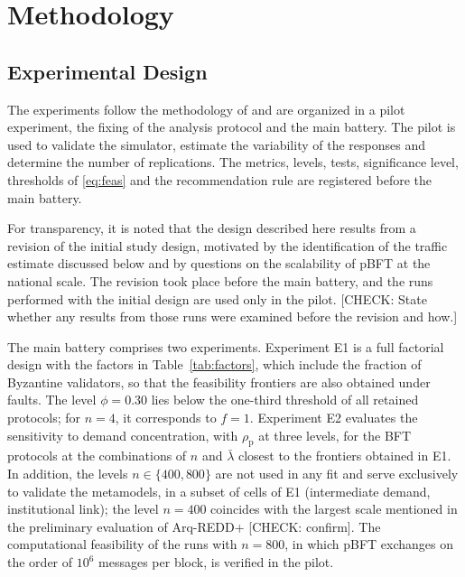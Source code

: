 \documentclass[english]{sbc2025}%
\newcommand{\chk}[1]{\textcolor{orange!80!black}{[CHECK: #1]}}
\begin{document}
\section{Methodology}
\label{sec:method}

\subsection{Experimental Design}

The experiments follow the methodology of \citet{Jain1991} and are organized in a pilot experiment, the fixing of the analysis protocol and the main battery. The pilot is used to validate the simulator, estimate the variability of the responses and determine the number of replications. The metrics, levels, tests, significance level, thresholds of \eqref{eq:feas} and the recommendation rule are registered before the main battery.

For transparency, it is noted that the design described here results from a revision of the initial study design, motivated by the identification of the traffic estimate discussed below and by questions on the scalability of pBFT at the national scale. The revision took place before the main battery, and the runs performed with the initial design are used only in the pilot. \chk{State whether any results from those runs were examined before the revision and how.}

The main battery comprises two experiments. Experiment E1 is a full factorial design with the factors in Table~\ref{tab:factors}, which include the fraction of Byzantine validators, so that the feasibility frontiers are also obtained under faults. The level $\phi = 0.30$ lies below the one-third threshold of all retained protocols; for $n = 4$, it corresponds to $f = 1$. Experiment E2 evaluates the sensitivity to demand concentration, with $\rho_{\mathrm{p}}$ at three levels, for the BFT protocols at the combinations of $n$ and $\bar{\lambda}$ closest to the frontiers obtained in E1. In addition, the levels $n \in \{400, 800\}$ are not used in any fit and serve exclusively to validate the metamodels, in a subset of cells of E1 (intermediate demand, institutional link); the level $n = 400$ coincides with the largest scale mentioned in the preliminary evaluation of Arq-REDD+ \chk{confirm}. The computational feasibility of the runs with $n = 800$, in which pBFT exchanges on the order of $10^{6}$ messages per block, is verified in the pilot.
\end{document}
